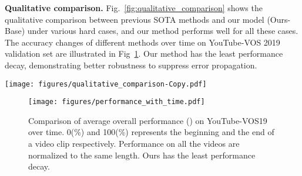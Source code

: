 \documentclass[sigconf]{acmart}
\begin{document}
\noindent\textbf{Qualitative comparison.}
Fig.~\ref{fig:qualitative_comparison} shows the qualitative comparison between previous SOTA methods and our model (Ours-Base) under various hard cases, and our method performs well for all these cases.
The accuracy changes of different methods over time on YouTube-VOS 2019 validation set are illustrated in Fig~\ref{fig:YTB_decay}. Our method has the least performance decay, demonstrating better robustness to suppress error propagation.


\begin{figure*}[t!]
	\centering
	\texttt{[image: figures/qualitative\_comparison-Copy.pdf]}
\caption{Qualitative comparison to competitive methods, JOINT and CFBI on YouTube-VOS 19 validation set. With the proposed adaptive proxy representation and object mask calibration for mask decoding, our model can tackle cases such as (a) object occlusion, (b) large camera rotation, and (c) fast motion better. Error regions are highlighted with blue bounding boxes.}
	\label{fig:qualitative_comparison}
\end{figure*} \begin{figure}[t]
\centering
\texttt{[image: figures/performance\_with\_time.pdf]}\caption{Comparison of average overall performance () on YouTube-VOS19 over time. 0(\%) and 100(\%) represents the beginning and the end of a video clip respectively. Performance on all the videos are normalized to the same length. Ours has the least performance decay.} \label{fig:YTB_decay}                   
\end{figure}
 
\end{document}
